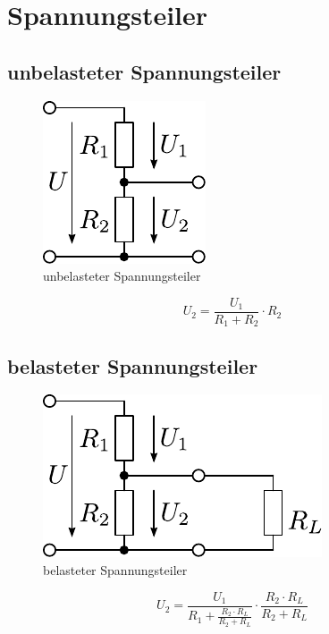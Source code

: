 



\section{Spannungsteiler}

\subsection{unbelasteter Spannungsteiler}
\begin{figure}[h!]
	\centering
	\includegraphics[scale=\schscale]{../fig/uteil.pdf}
	\caption{unbelasteter Spannungsteiler}
	\label{sch:uteil}
\end{figure}
\[ U_2 = \frac{U_1}{R_1 + R_2} \cdot R_2 \]

\subsection{belasteter Spannungsteiler}
\begin{figure}[h!]
	\centering
	\includegraphics[scale=\schscale]{../fig/uteilbel.pdf}
	\caption{belasteter Spannungsteiler}
	\label{sch:uteilbel}
\end{figure}
\[ U_2 = \frac{U_1}{R_1 + \frac{R_2 \cdot R_L}{R_2 + R_L}} \cdot \frac{R_2 \cdot R_L}{R_2 + R_L} \]

